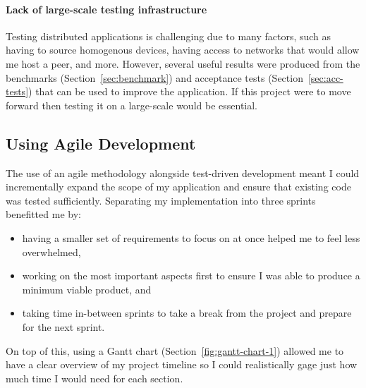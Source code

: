 \paragraph*{Lack of large-scale testing infrastructure}
Testing distributed applications is challenging due to many factors, such as having to source homogenous devices, having access to networks that would allow me host a peer, and more. However, several useful results were produced from the benchmarks (Section~\ref{sec:benchmark}) and acceptance tests (Section~\ref{sec:acc-tests}) that can be used to improve the application. If this project were to move forward then testing it on a large-scale would be essential.

\subsection*{Using Agile Development}

The use of an agile methodology alongside test-driven development meant I could incrementally expand the scope of my application and ensure that existing code was tested sufficiently. Separating my implementation into three sprints benefitted me by:

\begin{itemize}
  \item having a smaller set of requirements to focus on at once helped me to feel less overwhelmed,
  \item working on the most important aspects first to ensure I was able to produce a minimum viable product, and
  \item taking time in-between sprints to take a break from the project and prepare for the next sprint.
\end{itemize}

\newparagraph
On top of this, using a Gantt chart (Section~\ref{fig:gantt-chart-1}) allowed me to have a clear overview of my project timeline so I could realistically gage just how much time I would need for each section.